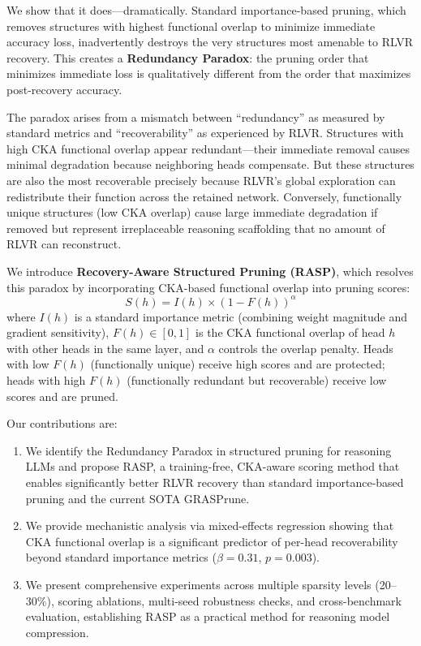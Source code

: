 \documentclass[11pt,a4paper]{article}
\begin{document}
We show that it does---dramatically. Standard importance-based pruning, which removes structures with highest functional overlap to minimize immediate accuracy loss, inadvertently destroys the very structures most amenable to RLVR recovery. This creates a \textbf{Redundancy Paradox}: the pruning order that minimizes immediate loss is qualitatively different from the order that maximizes post-recovery accuracy.

The paradox arises from a mismatch between ``redundancy'' as measured by standard metrics and ``recoverability'' as experienced by RLVR. Structures with high CKA functional overlap appear redundant---their immediate removal causes minimal degradation because neighboring heads compensate. But these structures are also the most recoverable precisely because RLVR's global exploration can redistribute their function across the retained network. Conversely, functionally unique structures (low CKA overlap) cause large immediate degradation if removed but represent irreplaceable reasoning scaffolding that no amount of RLVR can reconstruct.

We introduce \textbf{Recovery-Aware Structured Pruning (RASP)}, which resolves this paradox by incorporating CKA-based functional overlap into pruning scores:
\begin{equation}
S(h) = I(h) \times (1 - F(h))^\alpha
\label{eq:rasp}
\end{equation}
where $I(h)$ is a standard importance metric (combining weight magnitude and gradient sensitivity), $F(h) \in [0,1]$ is the CKA functional overlap of head $h$ with other heads in the same layer, and $\alpha$ controls the overlap penalty. Heads with low $F(h)$ (functionally unique) receive high scores and are protected; heads with high $F(h)$ (functionally redundant but recoverable) receive low scores and are pruned.

Our contributions are:
\begin{enumerate}
\item We identify the Redundancy Paradox in structured pruning for reasoning LLMs and propose RASP, a training-free, CKA-aware scoring method that enables significantly better RLVR recovery than standard importance-based pruning and the current SOTA GRASPrune.
\item We provide mechanistic analysis via mixed-effects regression showing that CKA functional overlap is a significant predictor of per-head recoverability beyond standard importance metrics ($\beta = 0.31$, $p = 0.003$).
\item We present comprehensive experiments across multiple sparsity levels (20--30\%), scoring ablations, multi-seed robustness checks, and cross-benchmark evaluation, establishing RASP as a practical method for reasoning model compression.
\end{enumerate}
\end{document}
